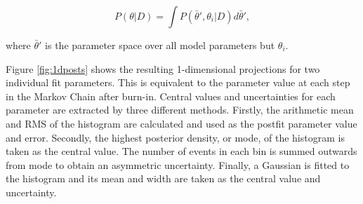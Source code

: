 \begin{equation}
P(\theta|D) = \int P(\bar{\theta}',\theta_i|D)d\bar{\theta}',
\end{equation}

where $\bar{\theta}'$ is the parameter space over all model parameters but $\theta_i$.

Figure \ref{fig:1dposts} shows the resulting 1-dimensional projections for two individual fit parameters. This is equivalent to the parameter value at each step in the Markov Chain after burn-in. Central values and uncertainties for each parameter are extracted by three different methods. Firstly, the arithmetic mean and RMS of the histogram are calculated and used as the postfit parameter value and error. Secondly, the highest posterior density, or mode, of the histogram is taken as the central value. The number of events in each bin is summed outwards from mode to obtain an asymmetric uncertainty. Finally, a Gaussian is fitted to the histogram and its mean and width are taken as the central value and uncertainty.

